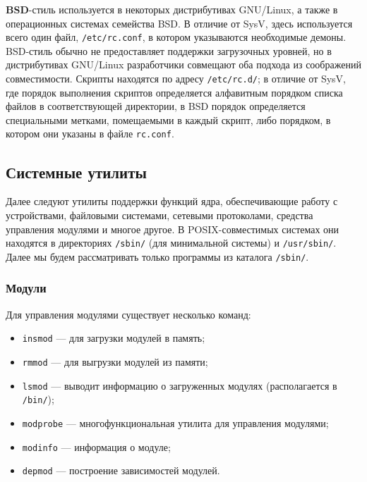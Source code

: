 \textbf{BSD}-стиль используется в некоторых дистрибутивах GNU/Linux, а также в операционных системах семейства BSD. В отличие от SysV, здесь используется всего один файл, \texttt{/etc/rc.conf}, в котором указываются необходимые демоны. BSD-стиль обычно не предоставляет поддержки загрузочных уровней, но в дистрибутивах GNU/Linux разработчики совмещают оба подхода из соображений совместимости.
Скрипты находятся по адресу \texttt{/etc/rc.d/}; в отличие от SysV, где порядок выполнения скриптов определяется алфавитным порядком списка файлов в соответствующей директории, в BSD порядок определяется специальными метками, помещаемыми в каждый скрипт, либо порядком, в котором они указаны в файле \texttt{rc.conf}.
 
\subsection{Системные утилиты}\label{base:os:structure:sysutils}
Далее следуют утилиты поддержки функций ядра, обеспечивающие работу с устройствами, файловыми системами, сетевыми протоколами, средства управления модулями и многое другое. В POSIX-совместимых системах они находятся в директориях \texttt{/sbin/} (для минимальной системы) и \texttt{/usr/sbin/}. Далее мы будем рассматривать только программы из каталога \texttt{/sbin/}.

\subsubsection{Модули}\label{base:os:structure:sysutils:modules}
Для управления модулями существует несколько команд:
\begin{itemize}
 \item \texttt{insmod} --- для загрузки модулей в память;
 \item \texttt{rmmod} --- для выгрузки модулей из памяти;
 \item \texttt{lsmod} --- выводит информацию о загруженных модулях (располагается в \texttt{/bin/});
 \item \texttt{modprobe} --- многофункциональная утилита для управления модулями;
 \item \texttt{modinfo} --- информация о модуле;
 \item \texttt{depmod} --- построение зависимостей модулей.
\end{itemize}

